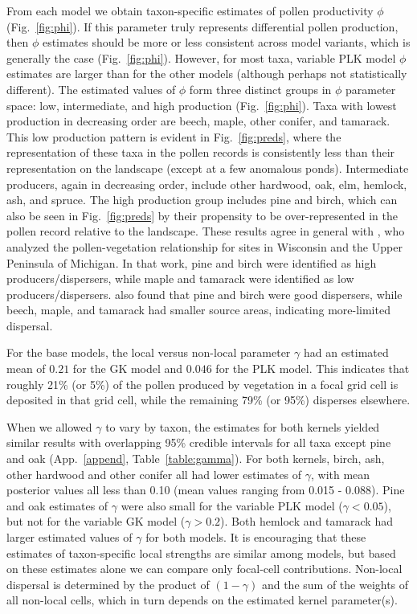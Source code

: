\documentclass[12pt]{article}
\begin{document}
From each model we obtain taxon-specific estimates of pollen
productivity $\phi$ (Fig.~\ref{fig:phi}). If this parameter truly
represents differential pollen production, then $\phi$ estimates
should be more or less consistent across model variants, which is
generally the case (Fig.~\ref{fig:phi}). However, for most taxa,
variable PLK model $\phi$ estimates are larger than for the other
models (although perhaps not statistically different). The estimated
values of $\phi$ form three distinct groups in $\phi$ parameter space:
low, intermediate, and high production (Fig.~\ref{fig:phi}). Taxa with
lowest production in decreasing order are beech, maple, other conifer,
and tamarack. This low production pattern is evident in
Fig.~\ref{fig:preds}, where the representation of these taxa in the
pollen records is consistently less than their representation on the
landscape (except at a few anomalous ponds). Intermediate producers,
again in decreasing order, include other hardwood, oak, elm, hemlock,
ash, and spruce. The high production group includes pine and birch,
which can also be seen in Fig.~\ref{fig:preds} by their propensity to
be over-represented in the pollen record relative to the
landscape. These results agree in general with \citet{prentice1986},
who analyzed the pollen-vegetation relationship for sites in Wisconsin
and the Upper Peninsula of Michigan. In that work, pine and birch were
identified as high producers/dispersers, while maple and tamarack were
identified as low producers/dispersers. \citet{jackson1990} also found
that pine and birch were good dispersers, while beech, maple, and
tamarack had smaller source areas, indicating more-limited dispersal.


For the base models, the local versus non-local parameter $\gamma$ had
an estimated mean of $0.21$ for the GK model and $0.046$ for the PLK
model. This indicates that roughly 21\% (or 5\%) of the pollen
produced by vegetation in a focal grid cell is deposited in that grid
cell, while the remaining 79\% (or 95\%) disperses elsewhere.

When we allowed $\gamma$ to vary by taxon, the estimates for both
kernels yielded similar results with overlapping 95\% credible
intervals for all taxa except pine and oak
(App.~\ref{append}, Table~\ref{table:gamma}). For both kernels, birch, ash, other
hardwood and other conifer all had lower estimates of $\gamma$, with
mean posterior values all less than 0.10 (mean values ranging from
0.015 - 0.088). Pine and oak estimates of $\gamma$ were also small for
the variable PLK model ($\gamma < 0.05$), but not for the variable GK
model ($\gamma > 0.2$). Both hemlock and tamarack had larger estimated
values of $\gamma$ for both models. It is encouraging that these
estimates of taxon-specific local strengths are similar among models,
but based on these estimates alone we can compare only focal-cell
contributions. Non-local dispersal is determined by the product of
$(1-\gamma)$ and the sum of the weights of all non-local cells, which
in turn depends on the estimated kernel parameter(s).
\end{document}
